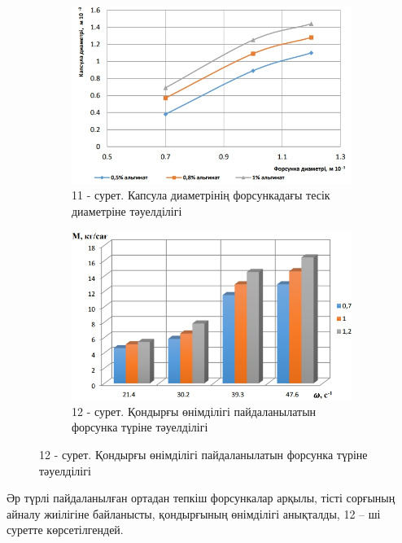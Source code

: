 \begin{figure}[H]
	\centering
	\begin{subfigure}{0.48\textwidth}
		\centering
		\includegraphics[width=\textwidth]{media/pish/image44}
		\caption*{11 - сурет. Капсула диаметрінің форсункадағы тесік диаметріне тәуелділігі}
	\end{subfigure}
	\begin{subfigure}{0.48\textwidth}
		\centering
		\includegraphics[width=\textwidth]{media/pish/image45}
		\caption*{12 - сурет. Қондырғы өнімділігі пайдаланылатын форсунка түріне тәуелділігі}
	\end{subfigure}
\end{figure}

Әр түрлі пайдаланылған ортадан тепкіш форсункалар арқылы, тісті сорғының
айналу жиілігіне байланысты, қондырғының өнімділігі анықталды, 12 -- ші
суретте көрсетілгендей.

